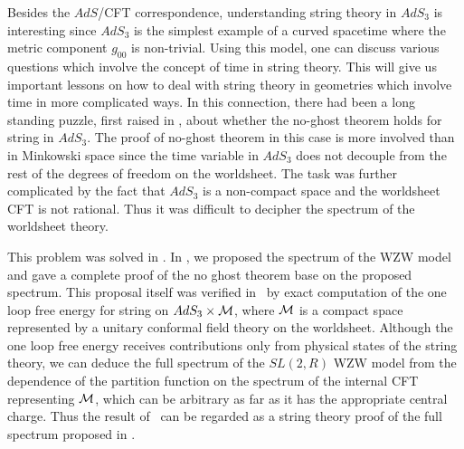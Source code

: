 Besides the $AdS$/CFT correspondence, understanding
string theory in $AdS_3$ is interesting since $AdS_3$
is the simplest example of a curved spacetime where the
metric component $g_{00}$ is non-trivial. Using this
model, one can discuss various questions which involve
the concept of time in string theory.
This will give us important lessons on how to deal with
string theory in geometries which involve time
in more complicated ways. In this connection, there
had been a long standing puzzle, first raised in
\lref{}
\lref{} ,
about whether the no-ghost
theorem holds for string in $AdS_3$.
The proof of no-ghost theorem in this case is more
involved than in Minkowski
space since the time variable in $AdS_3$
does not decouple from the rest of the degrees
of freedom on the worldsheet.
The task was further complicated by the
fact that $AdS_3$ is a non-compact space and
the worldsheet CFT is not rational.
Thus it was difficult to decipher the spectrum
of the worldsheet theory.

This problem was solved in .
In \first, we proposed the
spectrum of the WZW model and gave a complete
proof of the no ghost theorem base on the proposed
spectrum. This proposal itself
was verified in \second\ by exact computation of
the one loop free energy for string on
$AdS_3 \times {\cal M}$, where
${\cal M}$ is a compact space represented
by a unitary conformal field theory on the
worldsheet. Although
the one loop free energy receives contributions only
from physical states of the string theory, we can
deduce the full spectrum of the $SL(2,R)$ WZW
model from the dependence of the partition function
on the spectrum of the internal CFT representing
${\cal M}$, which can be arbitrary as far as
it has the appropriate central charge.
Thus the result of \second\ can be regarded
as a string theory
proof of the full spectrum proposed in \first.


